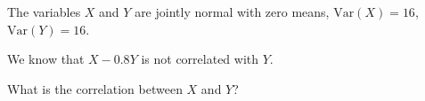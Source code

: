
\begin{question}
The variables \(X\) and \(Y\) are jointly normal with zero means, \(\mathrm{Var}(X) = 16\),
\(\mathrm{Var}(Y) = 16\).

We know that \(X -0.8 Y\) is not correlated with \(Y\).

What is the correlation between \(X\) and \(Y\)?
\end{question}


